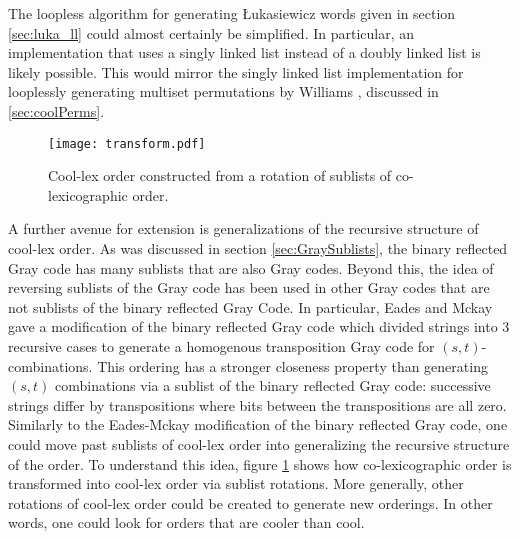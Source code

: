 The loopless algorithm for generating Łukasiewicz words given in section \ref{sec:luka_ll} could almost certainly be simplified.  In particular, an implementation that uses a singly linked list instead of a doubly linked list  is likely possible.  This would mirror the singly linked list implementation for looplessly generating multiset permutations by Williams \cite{williams2009loopless}, discussed in \ref{sec:coolPerms}.

\begin{figure}
\begin{center}
        \texttt{[image: transform.pdf]}
\end{center}
\caption{Cool-lex order constructed from a rotation of sublists of co-lexicographic order.}
\label{fig:cooltransform}
\end{figure}

A further avenue for extension is generalizations of the recursive structure of cool-lex order.  As was discussed in section \ref{sec:GraySublists}, the binary reflected Gray code has many sublists that are also Gray codes.  Beyond this, the idea of reversing sublists of the Gray code has been used in other Gray codes that are not sublists of the binary reflected Gray Code.  In particular, Eades and Mckay gave a modification of the binary reflected Gray code which divided strings into 3 recursive cases to generate a homogenous transposition Gray code for $(s,t)$-combinations. This ordering has a stronger closeness property than generating $(s,t)$ combinations via a sublist of the binary reflected Gray code: successive strings differ by transpositions where bits between the transpositions are all zero.  Similarly to the Eades-Mckay modification of the binary reflected Gray code, one could move past sublists of cool-lex order into generalizing the recursive structure of the order.  To understand this idea, figure \ref{fig:cooltransform} shows how co-lexicographic order is transformed into cool-lex order via sublist rotations.  More generally, other rotations of cool-lex order could be created to generate new orderings. In other words, one could look for orders that are cooler than cool. 






